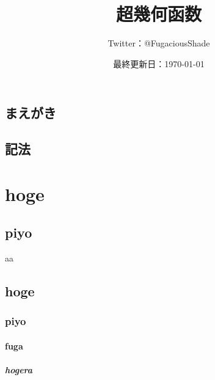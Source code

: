 \documentclass[a4paper,oneside,openany]{ltjsbook} %
\title{超幾何函数}
\author{Twitter：@FugaciousShade}
\date{最終更新日：\today}
\begin{document}
\maketitle %

\chapter*{まえがき}{
    
}

\setcounter{tocdepth}{4}  %
\tableofcontents  %

\chapter*{記法}{
    
}

\part{hoge}{
    \chapter{piyo}{
        aa
    }
}

\appendix
\chapter{hoge}
\section{piyo}
\subsection{fuga}
\subsubsection{hogera}



\end{document}

